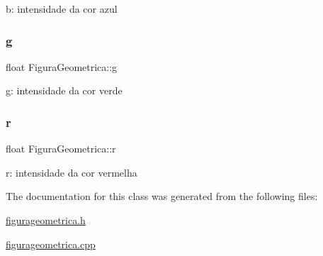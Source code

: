 b\+: intensidade da cor azul 

\mbox{\label{class_figura_geometrica_a51930549bcb90d016b824f10f95df355}} 
\subsubsection{\texorpdfstring{g}{g}}
{\footnotesize\ttfamily float Figura\+Geometrica\+::g\hspace{0.3cm}{\ttfamily [protected]}}



g\+: intensidade da cor verde 

\mbox{\label{class_figura_geometrica_a0a4f57efb1a6c525c8aeee34c92e7eab}} 
\subsubsection{\texorpdfstring{r}{r}}
{\footnotesize\ttfamily float Figura\+Geometrica\+::r\hspace{0.3cm}{\ttfamily [protected]}}



r\+: intensidade da cor vermelha 



The documentation for this class was generated from the following files\+:\begin{DoxyCompactItemize}
\item 
\hyperlink{figurageometrica_8h}{figurageometrica.\+h}\item 
\hyperlink{figurageometrica_8cpp}{figurageometrica.\+cpp}\end{DoxyCompactItemize}
